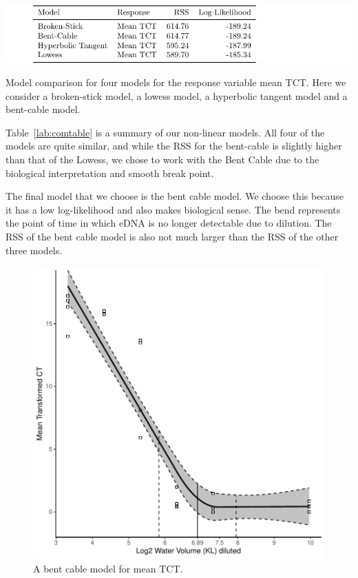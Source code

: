 \begin{table}[H]
\includegraphics{Chapter4Images/nichealternate.pdf}
\caption{\hspace{1mm}Model comparison for four models for the response variable mean TCT. Here we consider a broken-stick model, a lowess model, a hyperbolic tangent model and a bent-cable model.}
\label{lab:comtable}
\end{table}


Table~\ref{lab:comtable} is a summary of our non-linear models. All four of the models are quite similar, and while the RSS for the bent-cable is slightly higher than that of the Lowess, we chose to work with the Bent Cable due to the biological interpretation and smooth break point.


\newpage

The final model that we choose is the bent cable model. We choose this because it has a low log-likelihood and also makes biological sense. The bend represents the point of time in which eDNA is no longer detectable due to dilution. The RSS of the bent cable model is also not much larger than the RSS of the other three models.



\begin{figure}[H]
\includegraphics{Chapter4Images/flowggplot1.pdf}
\caption{\hspace{1mm} A bent cable model for mean TCT.}
\label{fig:bentcablemean}
\end{figure}


